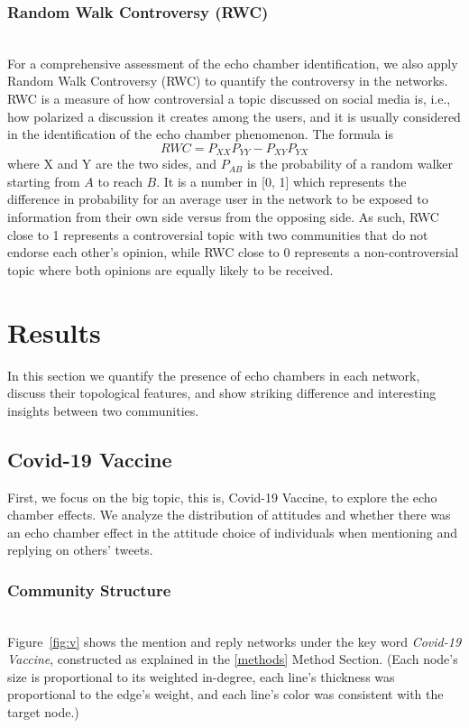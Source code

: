 \documentclass[sigplan,screen]{acmart}
\begin{document}
\subsubsection{Random Walk Controversy (RWC)}
~\\
For a comprehensive assessment of the echo chamber identification, we also apply Random Walk Controversy (RWC) {\cite{2015Quantifying}} to quantify the controversy in the networks. RWC is a measure of how controversial a topic discussed on social media is, i.e., how polarized a discussion it creates among the users, and it is usually considered in the identification of the echo chamber phenomenon. The formula is $$RWC = P_{XX}P_{YY} - P_{XY}P_{YX}$$ where X and Y are the two sides, and $P_{AB}$ is the probability of a random walker starting from $A$ to reach $B$.
It is a number in [0, 1] which represents the difference in probability for an average user in the network to be exposed to information from their own side versus from the opposing side. As such, RWC close to 1 represents a controversial topic with two communities that do not endorse each other’s opinion, while RWC close to 0 represents a non-controversial topic where both opinions are equally likely to be received.


\section{Results}
In this section we quantify the presence of echo chambers in each network, discuss their topological features, and show striking difference and interesting insights between two communities.

\subsection{Covid-19 Vaccine}
First, we focus on the big topic, this is, Covid-19 Vaccine, to explore the echo chamber effects. We analyze the distribution of attitudes and whether there was an echo chamber effect in the attitude choice of individuals when mentioning and replying on others’ tweets. 

\subsubsection{Community Structure}
~\\
Figure~\ref{fig:v} shows the mention and reply networks under the key word \textit{Covid-19 Vaccine}, constructed as explained in the \ref{methods} Method Section. (Each node’s size is proportional to its weighted in-degree, each line’s thickness was proportional to the edge’s weight, and each line’s color was consistent with the target node.)
\end{document}

